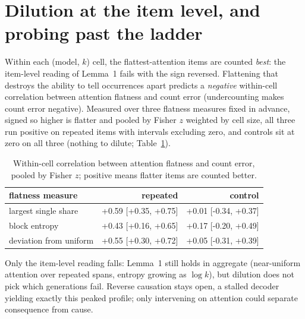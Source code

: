 \section{Dilution at the item level, and probing past the ladder}
\label{sec:dilution}

Within each (model, $k$) cell, the flattest-attention items are counted
\emph{best}: the item-level reading of Lemma~1 fails with the sign
reversed. Flattening that destroys the ability to tell occurrences
apart predicts a \emph{negative} within-cell correlation between
attention flatness and count error (undercounting makes count error
negative). Measured over three flatness measures fixed in advance,
signed so higher is flatter and pooled by Fisher $z$ weighted by cell
size, all three run positive on repeated items with intervals excluding
zero, and controls sit at zero on all three (nothing to dilute;
Table~\ref{tab:flatness}).
\begin{table}[tp]\centering
\caption{Within-cell correlation between attention flatness and count error, pooled by Fisher $z$; positive means flatter items are counted better.}
\label{tab:flatness}
\begin{tabular}{lrr}
\toprule
flatness measure & repeated & control \\
\midrule
largest single share   & +0.59 [+0.35, +0.75] & +0.01 [-0.34, +0.37] \\
block entropy          & +0.43 [+0.16, +0.65] & +0.17 [-0.20, +0.49] \\
deviation from uniform & +0.55 [+0.30, +0.72] & +0.05 [-0.31, +0.39] \\
\bottomrule
\end{tabular}
\end{table}
Only the item-level reading falls: Lemma~1 still holds in aggregate
(near-uniform attention over repeated spans, entropy growing as
$\log k$), but dilution does not pick which generations fail. Reverse
causation stays open, a stalled decoder yielding exactly this peaked
profile; only intervening on attention could separate consequence from
cause.

